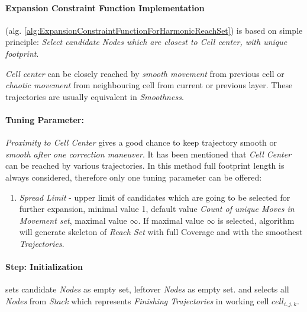 \paragraph{Expansion Constraint Function Implementation} (alg. \ref{alg:ExpansionConstraintFunctionForHarmonicReachSet}) is based on simple principle: \emph{Select candidate Nodes  which are closest to Cell center, with unique footprint}.

\begin{note}
    \emph{Cell center} can be closely reached by \emph{smooth movement} from previous cell or \emph{chaotic movement} from neighbouring cell from current or previous layer. These trajectories are usually equivalent in \emph{Smoothness}.
\end{note}

\paragraph{Tuning Parameter:} \emph{Proximity to Cell Center} gives a good chance to keep trajectory smooth or \emph{smooth after one correction maneuver}. It has been mentioned that \emph{Cell Center} can be reached by various trajectories. In this method full footprint length is always considered, therefore only one tuning parameter can be offered:
\begin{enumerate}
    \item \emph{Spread Limit} - upper limit of candidates which are going to be selected for further expansion, minimal value 1, default value \emph{Count of unique Moves in Movement set}, maximal value $\infty$. If maximal value $\infty$ is selected, algorithm will generate skeleton of \emph{Reach Set} with full Coverage and with the smoothest \emph{Trajectories}.
\end{enumerate}

\paragraph{Step: Initialization} sets candidate \emph{Nodes} as empty set, leftover \emph{Nodes} as empty set. and selects all \emph{Nodes} from \emph{Stack} which represents  \emph{Finishing Trajectories} in working cell $cell_{i,j,k}$.

